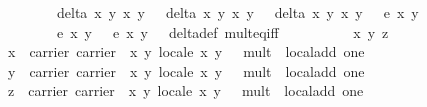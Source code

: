 \begin{isabellebody}
\ \ \ \ \ \ \ \ \ \ \ \ \ \ {\isacartoucheopen}delta\ x{}\ y{}\ x{}{\isacharprime}\ y{}{\isacharprime}\ {\isasymnoteq}\ {}{\isacartoucheclose}\ {\isacartoucheopen}delta\ x{}{\isacharprime}\ y{}{\isacharprime}\ x{}\ y{}\ {\isasymnoteq}\ {}{\isacartoucheclose}\ {\isacartoucheopen}delta\ x{}\ y{}\ x{}\ y{}\ {\isasymnoteq}\ {}{\isacartoucheclose}\ {\isacartoucheopen}e\ x{}\ y{}\ {\isacharequal}\ {}{\isacartoucheclose}\ \isanewline
\ \ \ \ \ \ \ \ \ \ \ \ \ \ {\isacartoucheopen}e\ x{}\ y{}\ {\isacharequal}\ {}{\isacartoucheclose}\ {\isacartoucheopen}e\ x{}\ y{}\ {\isacharequal}\ {}{\isacartoucheclose}\ delta{\isacharunderscore}def\ mult{\isacharunderscore}eq{\isacharunderscore}{}{\isacharunderscore}iff{\isacharparenright}\isacommand{{\isacharbraceright}}\isamarkupfalse%
\isanewline
\isanewline
\ \ \isamarkupfalse%
\ \isamarkupfalse%
\ {\isachardoublequoteopen}\isanewline
\ \ \ \ {\isasymAnd}x\ y\ z{\isachardot}\isanewline
\ \ \ \ \ \ \ x\ {\isasymin}\ carrier\ {\isasymlparr}carrier\ {\isacharequal}\ {\isacharbraceleft}{\isacharparenleft}x{\isacharcomma}\ y{\isacharparenright}{\isachardot}\ local{\isachardot}e\ x\ y\ {\isacharequal}\ {}{\isacharbraceright}{\isacharcomma}\ mult\ {\isacharequal}\ local{\isachardot}add{\isacharcomma}\ one\ {\isacharequal}\ {\isacharparenleft}{}{\isacharcomma}\ {}{\isacharparenright}{\isasymrparr}\ {\isasymLongrightarrow}\isanewline
\ \ \ \ \ \ \ y\ {\isasymin}\ carrier\ {\isasymlparr}carrier\ {\isacharequal}\ {\isacharbraceleft}{\isacharparenleft}x{\isacharcomma}\ y{\isacharparenright}{\isachardot}\ local{\isachardot}e\ x\ y\ {\isacharequal}\ {}{\isacharbraceright}{\isacharcomma}\ mult\ {\isacharequal}\ local{\isachardot}add{\isacharcomma}\ one\ {\isacharequal}\ {\isacharparenleft}{}{\isacharcomma}\ {}{\isacharparenright}{\isasymrparr}\ {\isasymLongrightarrow}\isanewline
\ \ \ \ \ \ \ z\ {\isasymin}\ carrier\ {\isasymlparr}carrier\ {\isacharequal}\ {\isacharbraceleft}{\isacharparenleft}x{\isacharcomma}\ y{\isacharparenright}{\isachardot}\ local{\isachardot}e\ x\ y\ {\isacharequal}\ {}{\isacharbraceright}{\isacharcomma}\ mult\ {\isacharequal}\ local{\isachardot}add{\isacharcomma}\ one\ {\isacharequal}\ {\isacharparenleft}{}{\isacharcomma}\ {}{\isacharparenright}{\isasymrparr}\ {\isasymLongrightarrow}\isanewline

\end{isabellebody}
